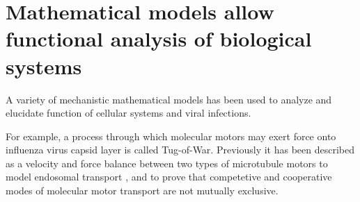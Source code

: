 \section{Mathematical models allow functional analysis of biological systems}

A variety of mechanistic mathematical models has been used to analyze and elucidate function of cellular systems and viral infections.

For example, a process through which molecular motors may exert force onto influenza virus capsid layer is called Tug-of-War. Previously it has been described as a velocity and force balance between two types of microtubule motors to model endosomal transport \cite{muller2008tug}, and to prove that competetive and cooperative modes of molecular motor transport are not mutually exclusive.



